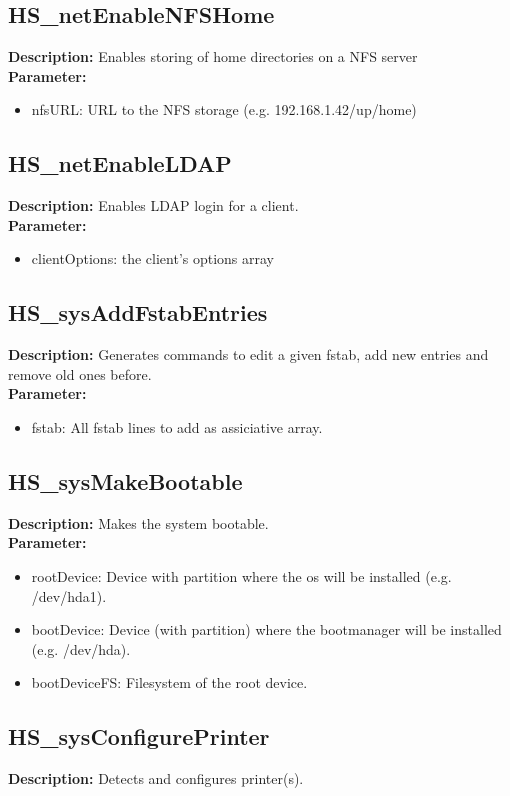 \subsection{HS\_netEnableNFSHome}
\textbf{Description:} Enables storing of home directories on a NFS server\\
\textbf{Parameter:}
\begin{itemize}
\item nfsURL: URL to the NFS storage (e.g. 192.168.1.42/up/home)
\end{itemize}

\subsection{HS\_netEnableLDAP}
\textbf{Description:} Enables LDAP login for a client.\\
\textbf{Parameter:}
\begin{itemize}
\item clientOptions: the client's options array
\end{itemize}

\subsection{HS\_sysAddFstabEntries}
\textbf{Description:} Generates commands to edit a given fstab, add new entries and remove old ones before.\\
\textbf{Parameter:}
\begin{itemize}
\item fstab: All fstab lines to add as assiciative array.
\end{itemize}

\subsection{HS\_sysMakeBootable}
\textbf{Description:} Makes the system bootable.\\
\textbf{Parameter:}
\begin{itemize}
\item rootDevice: Device with partition where the os will be installed (e.g. /dev/hda1).
\item bootDevice: Device (with partition) where the bootmanager will be installed (e.g. /dev/hda).
\item bootDeviceFS: Filesystem of the root device.
\end{itemize}

\subsection{HS\_sysConfigurePrinter}
\textbf{Description:} Detects and configures printer(s).\\

